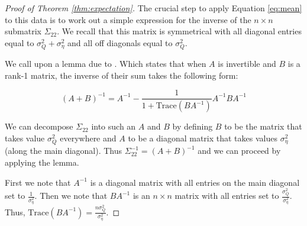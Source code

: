 \begin{proof}[Proof of Theorem \ref{thm:expectation}]

The crucial step to apply Equation \ref{eq:mean}
to this data is to work out a simple expression 
for the inverse of the $n\times n$ submatrix $\Sigma_{22}$.
We recall that this matrix is symmetrical with all diagonal entries equal to $\sigma_Q^2 + \sigma_\eta^2$ and all off diagonals equal to $\sigma_Q^2$.

We call upon a lemma due to \cite{miller1981inverse}.
Which states that when $A$ is invertible and $B$ is a rank-1 matrix, the inverse of their sum takes the following form:

\begin{equation}
(A+B)^{-1} = A^{-1} - \frac{1}{1 + \text{Trace}(B A^{-1})} A^{-1} B A^{-1} 
\end{equation}

We can decompose $\Sigma_{22}$
into such an $A$ and $B$
by defining $B$ to be the matrix
that takes value $\sigma_Q^2$ everywhere
and $A$ to be a diagonal matrix that takes values
$\sigma_\eta^2$ (along the main diagonal). 
Thus $\Sigma_{22}^{-1}= (A+B)^{-1}$ and we can proceed by applying the lemma.


First we note that $A^{-1}$ is a diagonal matrix 
with all entries on the main diagonal set to 
$\frac{1}{\sigma_\eta^2}$.
Then we note that $B A^{-1}$ 
is an $n \times n$ matrix with all entries 
set to $\frac{\sigma_Q^2}{\sigma_\eta^2}$.
Thus, $\text{Trace}(B A^{-1}) = \frac{n \sigma_Q^2}{\sigma_\eta^2}$.


\end{proof}
